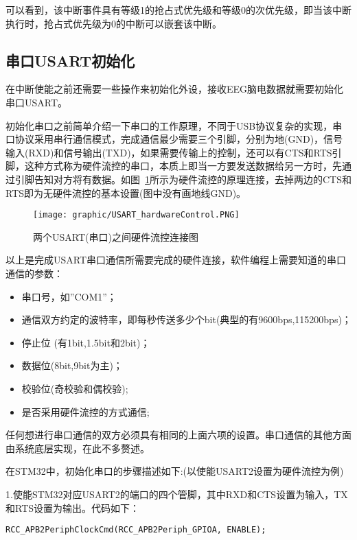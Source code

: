 可以看到，该中断事件具有等级1的抢占式优先级和等级0的次优先级，即当该中断执行时，抢占式优先级为0的中断可以嵌套该中断。

\subsection{串口USART初始化}
在中断使能之前还需要一些操作来初始化外设，接收EEG脑电数据就需要初始化串口USART。

初始化串口之前简单介绍一下串口的工作原理，不同于USB协议复杂的实现，串口协议采用串行通信模式，完成通信最少需要三个引脚，分别为地(GND)，信号输入(RXD)和信号输出(TXD)，如果需要传输上的控制，还可以有CTS和RTS引脚，这种方式称为硬件流控的串口，本质上即当一方要发送数据给另一方时，先通过引脚告知对方将有数据。如图~\ref{USARTHardFlow}所示为硬件流控的原理连接，去掉两边的CTS和RTS即为无硬件流控的基本设置(图中没有画地线GND)。

\begin{figure}[!hbp]
\begin{center}
\texttt{[image: graphic/USART\_hardwareControl.PNG]}
\caption{两个USART(串口)之间硬件流控连接图 \label{USARTHardFlow}}
\end{center}
\end{figure}

以上是完成USART串口通信所需要完成的硬件连接，软件编程上需要知道的串口通信的参数：
\begin{itemize}
\item	串口号，如”COM1”；
\item	通信双方约定的波特率，即每秒传送多少个bit(典型的有9600bps,115200bps)；
\item	停止位 (有1bit,1.5bit和2bit)；
\item	数据位(8bit,9bit为主)；
\item	校验位(奇校验和偶校验);
\item	是否采用硬件流控的方式通信;
\end{itemize}

	任何想进行串口通信的双方必须具有相同的上面六项的设置。串口通信的其他方面由系统底层实现，在此不多赘述。


在STM32中，初始化串口的步骤描述如下:(以使能USART2设置为硬件流控为例)

1.使能STM32对应USART2的端口的四个管脚，其中RXD和CTS设置为输入，TX和RTS设置为输出。代码如下：

\textit{\color{blue}{//使能端口时钟}}

\verb|RCC_APB2PeriphClockCmd(RCC_APB2Periph_GPIOA, ENABLE);|

